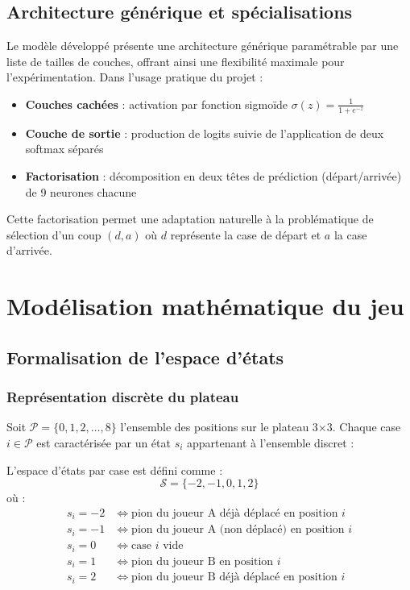 \documentclass[12pt,a4paper]{report}
\numberwithin{equation}{section}
\begin{document}
\section{Architecture générique et spécialisations}
Le modèle développé présente une architecture générique paramétrable par une liste de tailles de couches, offrant ainsi une flexibilité maximale pour l'expérimentation. Dans l'usage pratique du projet :
\begin{itemize}
  \item \textbf{Couches cachées} : activation par fonction sigmoïde $\sigma(z) = \frac{1}{1+e^{-z}}$
  \item \textbf{Couche de sortie} : production de logits suivie de l'application de deux softmax séparés
  \item \textbf{Factorisation} : décomposition en deux têtes de prédiction (départ/arrivée) de 9 neurones chacune
\end{itemize}

Cette factorisation permet une adaptation naturelle à la problématique de sélection d'un coup $(d,a)$ où $d$ représente la case de départ et $a$ la case d'arrivée.

\chapter{Modélisation mathématique du jeu}

\section{Formalisation de l'espace d'états}

\subsection{Représentation discrète du plateau}
Soit $\mathcal{P} = \{0, 1, 2, \ldots, 8\}$ l'ensemble des positions sur le plateau 3×3. Chaque case $i \in \mathcal{P}$ est caractérisée par un état $s_i$ appartenant à l'ensemble discret :

\begin{definition}
L'espace d'états par case est défini comme :
$$\mathcal{S} = \{-2, -1, 0, 1, 2\}$$
où :
\begin{align}
s_i = -2 &\iff \text{pion du joueur A déjà déplacé en position } i\\
s_i = -1 &\iff \text{pion du joueur A (non déplacé) en position } i\\
s_i = 0 &\iff \text{case } i \text{ vide}\\
s_i = 1 &\iff \text{pion du joueur B en position } i\\
s_i = 2 &\iff \text{pion du joueur B déjà déplacé en position } i
\end{align}
\end{definition}
\end{document}
